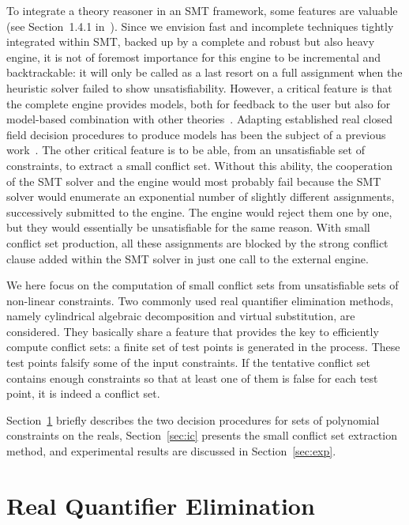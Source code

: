 \documentclass{llncs}
\begin{document}
To integrate a theory reasoner in an SMT framework, some features are valuable
(see Section~1.4.1 in~\cite{Barrett14}).  Since we envision fast and incomplete
techniques tightly integrated within SMT, backed up by a complete and robust but
also heavy engine, it is not of foremost importance for this engine to be
incremental and backtrackable: it will only be called as a last resort on a full
assignment when the heuristic solver failed to show unsatisfiability.  However,
a critical feature is that the complete engine provides models, both for
feedback to the user but also for model-based combination with other
theories~\cite{Moura5,Caminha4}.  Adapting established real closed field
decision procedures to produce models has been the subject of a previous
work~\cite{Kosta1}.  The other critical feature is to be able, from an
unsatisfiable set of constraints, to extract a small conflict set.  Without this
ability, the cooperation of the SMT solver and the engine would most probably
fail because the SMT solver would enumerate an exponential number of slightly
different assignments, successively submitted to the engine.  The engine would
reject them one by one, but they would essentially be unsatisfiable for the same
reason.  With small conflict set production, all these assignments are
blocked by the strong conflict clause added within the SMT solver in just one
call to the external engine.

We here focus on the computation of small conflict sets from unsatisfiable sets
of non-linear constraints.  Two commonly used real quantifier elimination
methods, namely cylindrical algebraic decomposition and virtual substitution,
are considered.  They basically share a feature that provides the key to
efficiently compute conflict sets: a finite set of test points is generated in
the process.  These test points falsify some of the input constraints.  If the
tentative conflict set contains enough constraints so that at least one of them
is false for each test point, it is indeed a conflict set.

Section~\ref{sec:qe} briefly describes the two decision procedures for sets of
polynomial constraints on the reals, Section~\ref{sec:ic} presents the small
conflict set extraction method, and experimental results are discussed in
Section~\ref{sec:exp}.

\section{Real Quantifier Elimination}
\label{sec:qe}
\end{document}
